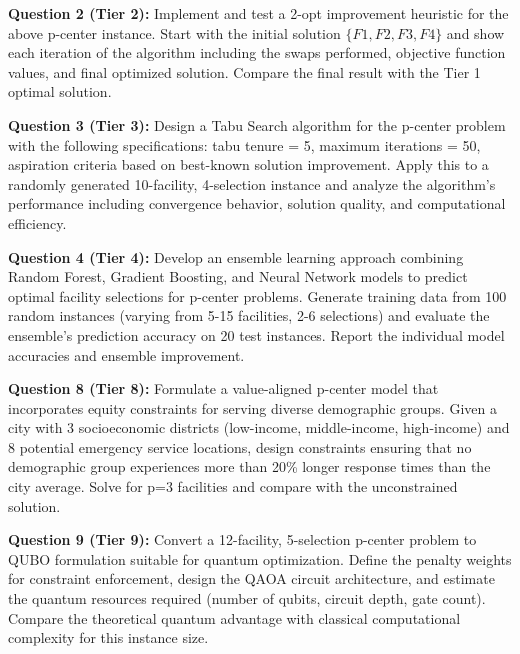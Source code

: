 \documentclass{article}
\begin{document}
\textbf{Question 2 (Tier 2):} 
Implement and test a 2-opt improvement heuristic for the above p-center instance. Start with the initial solution $\{F1, F2, F3, F4\}$ and show each iteration of the algorithm including the swaps performed, objective function values, and final optimized solution. Compare the final result with the Tier 1 optimal solution.

\textbf{Question 3 (Tier 3):} 
Design a Tabu Search algorithm for the p-center problem with the following specifications: tabu tenure = 5, maximum iterations = 50, aspiration criteria based on best-known solution improvement. Apply this to a randomly generated 10-facility, 4-selection instance and analyze the algorithm's performance including convergence behavior, solution quality, and computational efficiency.

\textbf{Question 4 (Tier 4):} 
Develop an ensemble learning approach combining Random Forest, Gradient Boosting, and Neural Network models to predict optimal facility selections for p-center problems. Generate training data from 100 random instances (varying from 5-15 facilities, 2-6 selections) and evaluate the ensemble's prediction accuracy on 20 test instances. Report the individual model accuracies and ensemble improvement.

\textbf{Question 8 (Tier 8):} 
Formulate a value-aligned p-center model that incorporates equity constraints for serving diverse demographic groups. Given a city with 3 socioeconomic districts (low-income, middle-income, high-income) and 8 potential emergency service locations, design constraints ensuring that no demographic group experiences more than 20\% longer response times than the city average. Solve for p=3 facilities and compare with the unconstrained solution.

\textbf{Question 9 (Tier 9):} 
Convert a 12-facility, 5-selection p-center problem to QUBO formulation suitable for quantum optimization. Define the penalty weights for constraint enforcement, design the QAOA circuit architecture, and estimate the quantum resources required (number of qubits, circuit depth, gate count). Compare the theoretical quantum advantage with classical computational complexity for this instance size.
\end{document}

